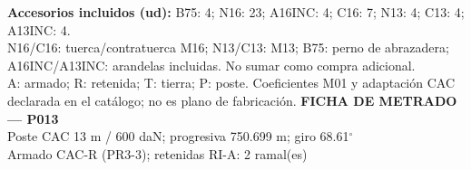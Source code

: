 \begingroup\scriptsize
\textbf{Accesorios incluidos (ud):} B75: 4; N16: 23; A16INC: 4; C16: 7; N13: 4; C13: 4; A13INC: 4.\\
N16/C16: tuerca/contratuerca M16; N13/C13: M13; B75: perno de abrazadera; A16INC/A13INC: arandelas incluidas. No sumar como compra adicional.\\
A: armado; R: retenida; T: tierra; P: poste. Coeficientes M01 y adaptación CAC declarada en el catálogo; no es plano de fabricación.
\endgroup\endgroup
\clearpage{}
\begingroup\small\setlength{\parskip}{3pt}\renewcommand{\arraystretch}{1.05}
\textbf{\large FICHA DE METRADO — P013}\\[4pt]
Poste CAC 13 m / 600 daN; progresiva 750.699 m; giro 68.61\ensuremath{^\circ}\\
Armado CAC-R (PR3-3); retenidas RI-A: 2 ramal(es)\\
\begingroup\scriptsize
